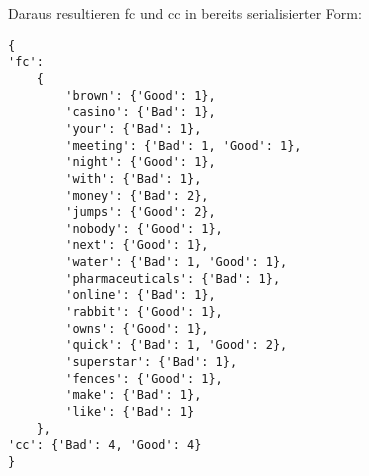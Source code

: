 \documentclass[12pt,a4paper]{scrartcl}
\begin{document}
Daraus resultieren fc und cc in bereits serialisierter Form:

\begin{lstlisting}
{
'fc':
	{
		'brown': {'Good': 1}, 
		'casino': {'Bad': 1}, 
		'your': {'Bad': 1}, 
		'meeting': {'Bad': 1, 'Good': 1}, 
		'night': {'Good': 1}, 
		'with': {'Bad': 1}, 
		'money': {'Bad': 2}, 
		'jumps': {'Good': 2}, 
		'nobody': {'Good': 1}, 
		'next': {'Good': 1}, 
		'water': {'Bad': 1, 'Good': 1}, 
		'pharmaceuticals': {'Bad': 1}, 
		'online': {'Bad': 1}, 
		'rabbit': {'Good': 1}, 
		'owns': {'Good': 1}, 
		'quick': {'Bad': 1, 'Good': 2}, 
		'superstar': {'Bad': 1}, 
		'fences': {'Good': 1}, 
		'make': {'Bad': 1}, 
		'like': {'Bad': 1}	
	}, 
'cc': {'Bad': 4, 'Good': 4}
}
\end{lstlisting}
\end{document}
